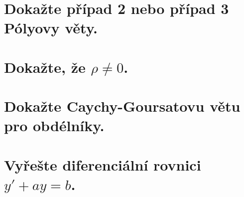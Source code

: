 \documentclass[11pt]{article}
\theoremstyle{nontheoremstyle}
\theoremstyle{nontheoremstylenodot}
\theoremstyle{theoremstyle}
\begin{document}
\section{Dokažte případ 2 nebo případ 3 Pólyovy věty.}
\section{Dokažte, že $\rho \neq 0$.}
\section{Dokažte Caychy-Goursatovu větu pro obdélníky.}
\section{Vyřešte diferenciální rovnici $y' + ay = b$.}
\end{document}
